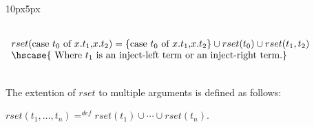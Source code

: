\begin{definition}
\begin{changemargin}{10px}{5px}
\begin{math}
\begin{array}{lll}
{      }\\
      & \\
      rset(\ccon{t_0}{x}{t_1}{t_2}) = \{\ccon{t_0}{x}{t_1}{t_2}\} \cup rset(t_0) \cup rset(t_1,t_2)\\
      \hscase{
        \text{ Where } t_1 \text{ is an inject-left term or an inject-right term.}
      }\\
    \end{array}
    \end{math}
    \end{changemargin}
  \ \\
  The extention of $rset$ to multiple arguments is defined as follows:
  \begin{center}
    $rset(t_1, \ldots, t_n) =^{def} rset(t_1) \cup \cdots \cup rset(t_n)$.
  \end{center}
\end{definition}

